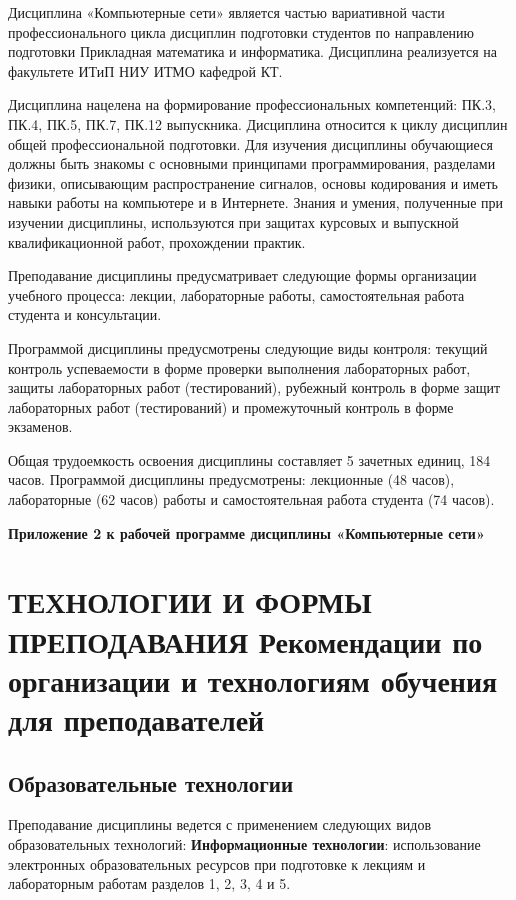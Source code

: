 \begin{center}
Дисциплина «Компьютерные сети» является частью вариативной части профессионального цикла дисциплин подготовки студентов по направлению подготовки Прикладная математика и информатика.
Дисциплина реализуется на факультете ИТиП НИУ ИТМО кафедрой КТ.

Дисциплина нацелена на формирование профессиональных компетенций: ПК.3, ПК.4, ПК.5, ПК.7, ПК.12 выпускника. Дисциплина относится к циклу дисциплин общей профессиональной подготовки. Для изучения дисциплины обучающиеся должны быть знакомы с основными принципами программирования, разделами физики, описывающим распространение сигналов, основы кодирования и иметь навыки работы на компьютере и в Интернете. Знания и умения, полученные при изучении дисциплины, используются при защитах курсовых и выпускной квалификационной работ, прохождении практик.

Преподавание дисциплины предусматривает следующие формы организации учебного процесса: лекции, лабораторные работы, самостоятельная работа студента и консультации.

Программой дисциплины предусмотрены следующие виды контроля: текущий контроль успеваемости в форме
проверки выполнения лабораторных работ, защиты лабораторных работ (тестирований), рубежный контроль в форме защит лабораторных работ (тестирований) и промежуточный контроль в форме экзаменов.

Общая трудоемкость освоения дисциплины составляет 5 зачетных единиц, 184 часов. Программой дисциплины предусмотрены: лекционные   (48 часов), лабораторные (62 часов) работы и самостоятельная работа студента (74 часов).

\newpage
\begin{flushright}
\textbf{Приложение 2
к рабочей программе дисциплины
«Компьютерные сети»}
\end{flushright}

\section*{ТЕХНОЛОГИИ И ФОРМЫ ПРЕПОДАВАНИЯ
Рекомендации по организации и технологиям обучения для преподавателей}

\def\thesubsection{\Roman{subsection}}

\subsection{Образовательные технологии}

{\parindent0pt
Преподавание дисциплины ведется с применением следующих видов образовательных технологий:
\textbf{Информационные технологии}: использование электронных образовательных ресурсов при подготовке к лекциям и лабораторным работам разделов 1, 2, 3, 4 и 5.

}
\end{center}
